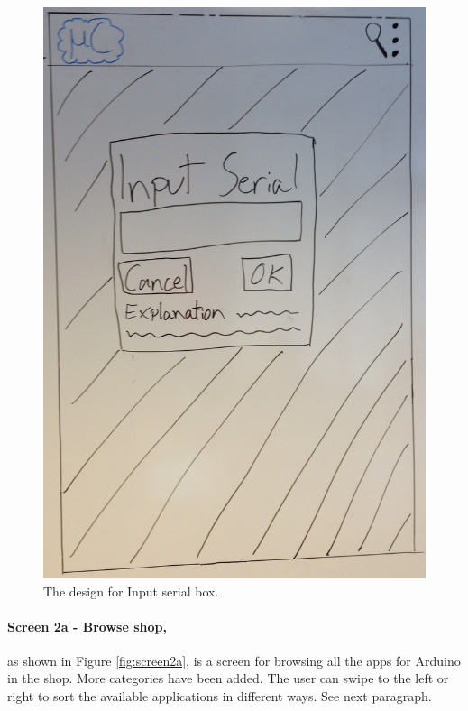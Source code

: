 \begin{figure}[H]
\centering
\includegraphics[scale=0.2]{images/Design_guide/Screen1b-i.png}
\caption[Screen 1b-i - Input serial]{The design for Input serial box.}
\label{fig:screen1bi}
\end{figure}


\paragraph{Screen 2a - Browse shop,} as shown in Figure \ref{fig:screen2a}, is a screen for browsing all the apps for Arduino in the shop. More categories have been added. The user can swipe to the left or right to sort the available applications in different ways. See next paragraph.


